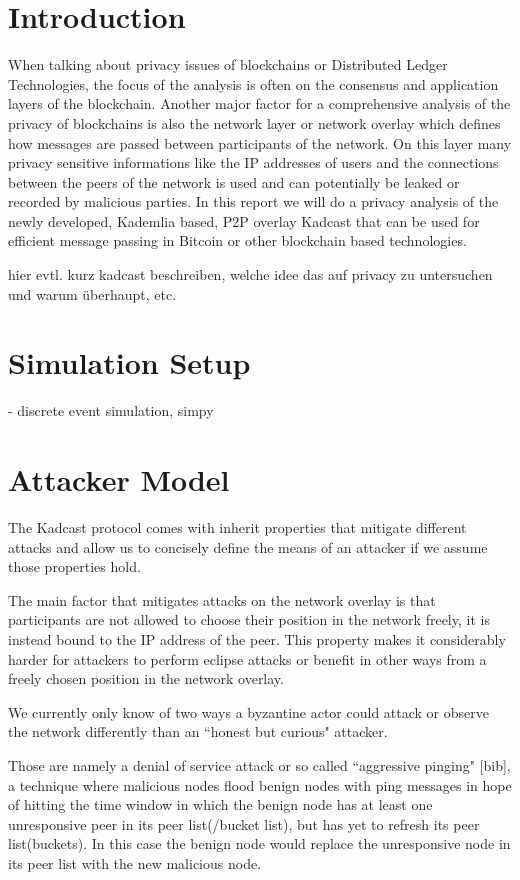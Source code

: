 \section{Introduction}
When talking about privacy issues of blockchains or Distributed Ledger Technologies, the
focus of the analysis is often on the consensus and application layers of the blockchain.
Another major factor for a comprehensive analysis of the privacy of blockchains is also
the network layer or network overlay which defines how messages are passed between participants of the network.
On this layer many privacy sensitive informations like the IP addresses of users and the connections between the peers
of the network is used and can potentially be leaked or recorded by malicious parties.
In this report we will do a privacy analysis of the newly developed, Kademlia based,
P2P overlay Kadcast that can be used for efficient message passing in Bitcoin or other blockchain based technologies.

hier evtl. kurz kadcast beschreiben, welche idee das auf privacy zu untersuchen und warum überhaupt, etc.

\section{Simulation Setup}
- discrete event simulation, simpy

\section{Attacker Model}
The Kadcast protocol comes with inherit properties that mitigate different attacks
and allow us to concisely define the means of an attacker if we assume those properties hold.

The main factor that mitigates attacks on the network overlay is that participants are
not allowed to choose their position in the network freely, it is instead bound to the IP address of the peer.
This property makes it considerably harder for attackers to perform eclipse attacks or benefit in other ways from
a freely chosen position in the network overlay.

We currently only know of two ways a byzantine actor could attack or observe the network differently than
an ``honest but curious" attacker.

Those are namely a denial of service attack or so called ``aggressive pinging" [bib], a technique where malicious nodes flood
benign nodes with ping messages in hope of hitting the time window in which the benign node has at least one unresponsive
peer in its peer list(/bucket list), but has yet to refresh its peer list(buckets). In this case
the benign node would replace the unresponsive node in its peer list with the new malicious node.


